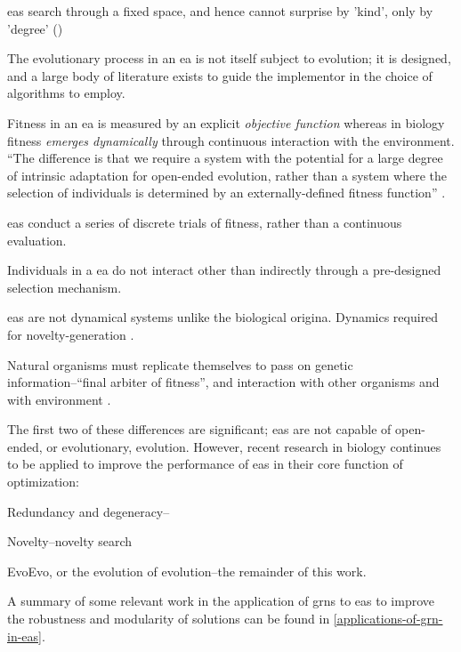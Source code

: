 \begin{compactitem}
\item \Glspl{ea} search through a fixed space, and hence cannot surprise by 'kind', only by 'degree' (\eg \cite{Nellis2014})
\item The evolutionary process in an \gls{ea} is not itself subject to evolution; it is designed, and a large body of literature exists to guide the implementor in the choice of algorithms to employ.
\item Fitness in an \gls{ea} is measured by an explicit \emph{objective function} whereas in biology fitness \emph{emerges dynamically} through continuous interaction with the environment. ``The difference is that we require a system with the potential for a large degree of intrinsic adaptation for open-ended evolution, rather than a system where the selection of individuals is determined by an externally-defined fitness function'' \parencite{Taylor2001}.
\item \Glspl{ea} conduct a series of discrete trials of fitness, rather than a continuous evaluation.
\item Individuals in a \gls{ea} do not interact other than indirectly through a pre-designed selection mechanism.
\item \Glspl{ea} are not dynamical systems unlike the biological origina. Dynamics required for novelty-generation \parencite{Nellis2012}.
\item Natural organisms must replicate themselves to pass on genetic information--``final arbiter of fitness'', and interaction with other organisms and with environment \parencite{Ofria2004}.
\end{compactitem}

The first two of these differences are significant; \glspl{ea} are not capable of open-ended, or evolutionary, evolution. However, recent research in biology continues to be applied to improve the performance of \glspl{ea} in their core function of optimization:
\begin{compactitem}
	\item Redundancy and degeneracy--\eg \cite{Whitacre:2010qy}
	\item Novelty--\eg novelty search \parencite{Lehman:2008cr}
	\item EvoEvo, or the evolution of evolution--\eg the remainder of this work.
\end{compactitem}

A summary of some relevant work in the application of \glspl{grn} to \glspl{ea} to improve the robustness and modularity of solutions can be found in \cref{applications-of-grn-in-eas}.

